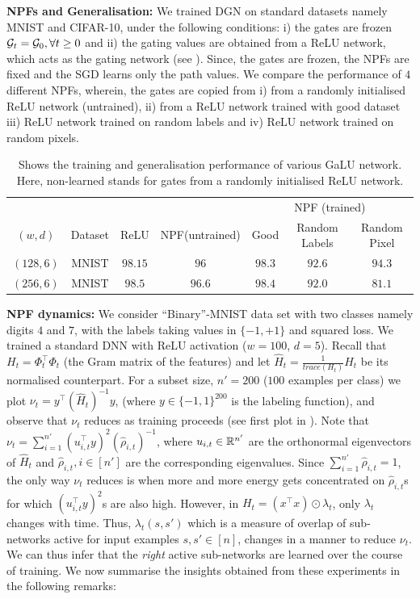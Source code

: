 \textbf{NPFs and Generalisation:} We trained DGN on standard datasets namely MNIST and CIFAR-10, under the following conditions: i) the gates are frozen $\mathcal{G}_t=\mathcal{G}_0,\forall t\geq 0$ and ii) the gating values are obtained from a ReLU network, which acts as the gating network (see ). Since, the gates are frozen, the NPFs are fixed and the SGD learns only the path values. We compare the performance of $4$ different NPFs, wherein, the gates are copied from i) from a randomly initialised ReLU network (untrained), ii) from a ReLU network trained with good dataset iii) ReLU network trained on random labels and iv) ReLU network trained on random pixels.
\FloatBarrier
\begin{table}[h]
\begin{tabular}{|c|c|c|c|c|c|c|}\hline
&&&&\multicolumn{3}{c|}{NPF (trained)}\\\cline{5-7}
$(w,d)$	&Dataset		&ReLU		&NPF(untrained) 		&Good 		&Random Labels 	&Random Pixel\\\hline
$(128,6)$	& MNIST 		& $98.15$ 		&$96$ 		&$98.3$		&$92.6$			&$94.3$\\\hline
$(256,6)$	& MNIST 		& $98.5$ 		&$96.6$ 		&$98.4$		&$92.0$			&$81.1$\\\hline
\end{tabular}
\caption{Shows the training and generalisation performance of various GaLU network. Here, non-learned stands for gates from a randomly initialised ReLU network.}
\label{tb:npfs}
\end{table}
\textbf{NPF dynamics:} 
We consider ``Binary''-MNIST data set with two classes namely digits $4$ and $7$, with the labels taking values in $\{-1,+1\}$ and squared loss. We trained a standard DNN with ReLU activation ($w=100$, $d=5$). Recall that $H_t=\Phi^\top_t\Phi_t$  (the Gram matrix of the features) and let $\widehat{H}_t=\frac{1}{trace(H_t)}H_t$ be its normalised counterpart. For a subset size, $n'=200$ ($100$ examples per class) we plot $\nu_t=y^\top (\widehat{H}_t)^{-1} y$, (where $y\in\{-1,1\}^{200}$ is the labeling function), and observe that $\nu_t$ reduces as training proceeds (see first plot in ). Note that $\nu_t=\sum_{i=1}^{n'}(u_{i,t}^\top y)^2 (\hat{\rho}_{i,t})^{-1}$, where $u_{i,t}\in \mathbb{R}^{n'}$ are the orthonormal eigenvectors of $\widehat{H}_t$ and $\hat{\rho}_{i,t},i\in[n']$ are the corresponding eigenvalues. Since $\sum_{i=1}^{n'}\hat{\rho}_{i,t}=1$, the only way $\nu_t$ reduces is when more and more energy gets concentrated on $\hat{\rho}_{i,t}$s for which $(u_{i,t}^\top y)^2$s are also high. However, in $H_t=(x^\top x)\odot \lambda_t$, only $\lambda_t$ changes with time. Thus, $\lambda_t(s,s')$ which is a measure of overlap of sub-networks active for input examples $s,s'\in[n]$, changes in a manner to reduce $\nu_t$. We can thus infer that the \emph{right} active sub-networks are learned over the course of training. We now summarise the insights obtained from these experiments in the following remarks:\hfill\\

